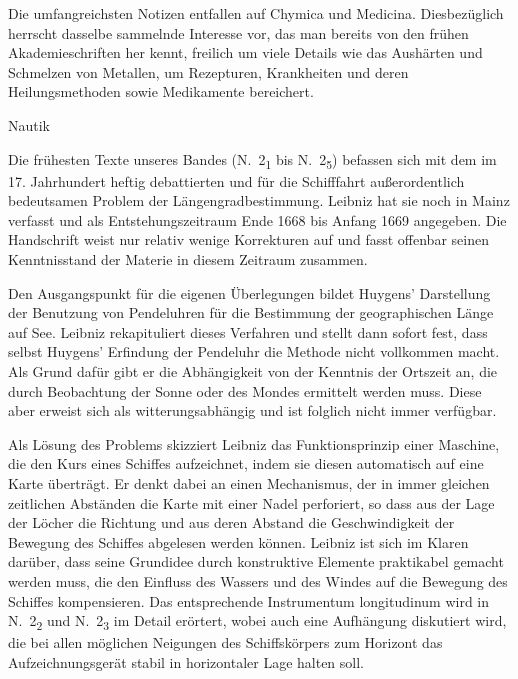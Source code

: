 Die umfangreichsten Notizen entfallen auf Chymica und Medicina. Dies\-bez\"{u}glich herrscht dasselbe sammelnde Interesse vor, das man bereits von den fr\"{u}hen Akademieschriften her kennt, freilich um viele Details wie das Aus\-h\"{a}rten und Schmelzen von Metallen, um Rezepturen, Krankheiten und deren Heilungsmethoden sowie Medikamente bereichert.\par\vspace{2.0ex}

Nautik\par\vspace{1.0ex}

Die fr\"{u}hesten Texte unseres Bandes (N.~2\textsubscript{1} bis N.~2\textsubscript{5}) befassen sich mit dem im 17. Jahrhundert heftig debattierten und f\"{u}r die Schifffahrt au{\ss}erordentlich bedeutsamen Problem der L\"{a}ngengradbestimmung. Leibniz hat sie noch in Mainz verfasst und als Entstehungszeitraum Ende 1668 bis Anfang 1669 angegeben. Die Handschrift weist nur relativ wenige Korrekturen auf und fasst offenbar seinen Kenntnisstand der Materie in diesem Zeitraum zusammen.\par
Den Ausgangspunkt f\"{u}r die eigenen \"{U}berlegungen bildet Huygens' Darstellung der Benutzung von Pendeluhren f\"{u}r die Bestimmung der geographischen L\"{a}nge auf See. Leibniz rekapituliert dieses Verfahren und stellt dann sofort fest, dass selbst Huygens' Erfindung der Pendeluhr die Methode nicht vollkommen \mbox{macht}. Als Grund daf\"{u}r gibt er die Abh\"{a}ngigkeit von der Kenntnis der Orts\-zeit an, die durch Beobachtung der Sonne oder des Mondes ermittelt werden muss. Diese aber erweist sich als witterungsabh\"{a}ngig und ist folglich nicht immer verf\"{u}gbar.\par
Als L\"{o}sung des Problems skizziert Leibniz das Funktionsprinzip einer Maschine, die den Kurs eines Schiffes aufzeichnet, indem sie diesen automatisch auf eine Karte \"{u}bertr\"{a}gt. Er denkt dabei an einen Mechanismus, der in immer gleichen zeitlichen Abst\"{a}nden die Karte mit einer Nadel perforiert, so dass aus der Lage der L\"{o}cher die Rich\-tung und aus deren Abstand die Geschwindigkeit der Bewegung des Schiffes abgelesen werden k\"{o}nnen. Leibniz ist sich im Klaren dar\"{u}ber, dass seine Grundidee durch konstruktive Elemente praktikabel gemacht werden muss, die den Einfluss des Wassers und des Windes auf die Bewegung des Schiffes kompensieren. Das entsprechende Instrumentum longitudinum wird in N.~2\textsubscript{2} und N.~2\textsubscript{3} im Detail er\"{o}rtert, wobei auch eine Aufh\"{a}ngung diskutiert wird, die bei allen m\"{o}glichen Neigungen des Schiffsk\"{o}rpers zum Horizont das Aufzeichnungsger\"{a}t stabil in horizontaler Lage halten soll.\par
